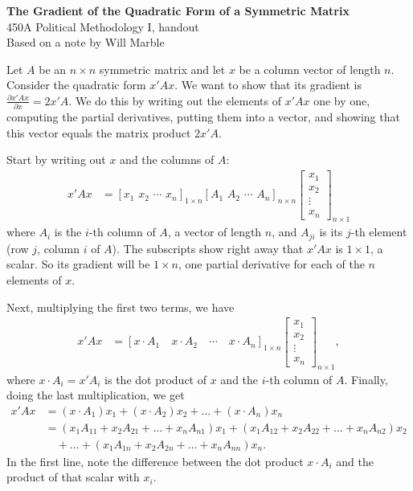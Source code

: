 \documentclass[12pt]{article}
\begin{document}
\begin{center}
{\large\bfseries The Gradient of the Quadratic Form of a Symmetric Matrix}\\[4pt]
450A Political Methodology I, handout\\[2pt]
{\small Based on a note by Will Marble}
\end{center}

Let $A$ be an $n \times n$ symmetric matrix and let $x$ be a column vector of length $n$. Consider the quadratic form $x'Ax$. We want to show that its gradient is $\frac{\partial x'Ax}{\partial x} = 2 x' A$. We do this by writing out the elements of $x'Ax$ one by one, computing the partial derivatives, putting them into a vector, and showing that this vector equals the matrix product $2x'A$.

Start by writing out $x$ and the columns of $A$:
\begin{align}
x'Ax &= [ x_1 \,\,  x_2 \,\, \cdots \,\, x_n ]_{1 \times n} [
	A_1 \,\, A_2 \,\, \cdots \,\, A_n]_{n\times n} \begin{bmatrix}
	x_1 \\ x_2 \\ \vdots \\ x_n
	\end{bmatrix}_{n\times 1}
\end{align}
where $A_i$ is the $i$-th column of $A$, a vector of length $n$, and $A_{ji}$ is its $j$-th element (row $j$, column $i$ of $A$). The subscripts show right away that $x'Ax$ is $1 \times 1$, a scalar. So its gradient will be $1 \times n$, one partial derivative for each of the $n$ elements of $x$.

Next, multiplying the first two terms, we have
\begin{align}
	x'Ax &= [x \cdot A_1 \quad x \cdot A_2 \quad \cdots \quad x \cdot A_n]_{1 \times n} \begin{bmatrix}
	x_1 \\ x_2 \\ \vdots \\ x_n
	\end{bmatrix}_{n\times 1},
\end{align}
where $x \cdot A_i = x'A_i$ is the dot product of $x$ and the $i$-th column of $A$. Finally, doing the last multiplication, we get
\begin{align}
	x'Ax &= (x \cdot A_1) x_1 +( x \cdot A_2  )x_2 + \dots + (x \cdot A_n ) x_n \\
	&= (x_1 A_{11} + x_2 A_{21} + \dots + x_n A_{n1}) x_1 + (x_1 A_{12} + x_2 A_{22} + \dots +  x_n A_{n2}) x_2 \nonumber \\
	&\quad + \dots + (x_1 A_{1n} + x_2 A_{2n} + \dots + x_n A_{nn}) x_n .
\end{align}
In the first line, note the difference between the dot product $x \cdot A_i$ and the product of that scalar with $x_i$.
\end{document}
